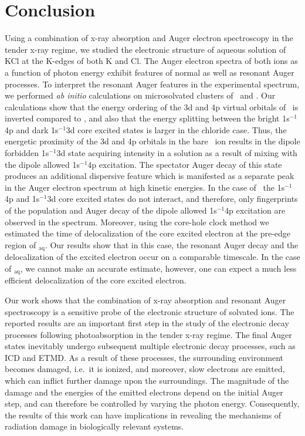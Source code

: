\section{Conclusion}\label{sec:concl}

Using a combination of x-ray absorption and Auger electron spectroscopy in the tender x-ray regime, we studied the electronic structure of aqueous solution of KCl at the K-edges of both K and Cl. The Auger electron spectra of both ions as a function of photon energy exhibit features of normal as well as resonant Auger processes. To interpret the resonant Auger features in the experimental spectrum, we performed {\it ab initio} calculations on microsolvated clusters of \ki~and \cli. Our calculations show that the energy ordering of the 3d and 4p virtual orbitals of \cli~is inverted compared to \ki, and also that the energy splitting between the bright 1s$^{-1}$4p and dark 1s$^{-1}$3d core excited states is larger in the chloride case. Thus, the energetic proximity of the 3d and 4p orbitals in the bare \ki~ion results in the dipole forbidden 1s$^{-1}$3d state acquiring intensity in a solution as a result of mixing with the dipole allowed 1s$^{-1}$4p excitation. The spectator Auger decay of this state produces an additional dispersive feature which is manifested as a separate peak in the Auger electron spectrum at high kinetic energies. In the case of \cli~the 1s$^{-1}$4p and 1s$^{-1}$3d core excited states do not interact, and therefore, only fingerprints of the population and Auger decay of the dipole allowed 1s$^{-1}$4p excitation are observed in the spectrum. Moreover, using the core-hole clock method we estimated the time of delocalization of the core excited electron at the pre-edge region of \cli$_{\text{aq}}$. Our results show that in this case, the resonant Auger decay and the delocalization of the excited electron occur on a comparable timescale. In the case of \ki$_{\text{aq}}$, we cannot make an accurate estimate, however, one can expect a much less efficient delocalization of the core excited electron.


Our work shows that the combination of x-ray absorption and resonant Auger spectroscopy is a sensitive probe of the electronic structure of solvated ions. The reported results are an important first step in the study of the electronic decay processes following photoabsorption in the tender x-ray regime. The final Auger states inevitably undergo subsequent multiple electronic decay processes, such as ICD and ETMD. As a result of these processes, the surrounding environment becomes damaged, i.e.\ it is ionized, and moreover, slow electrons are emitted, which can inflict further damage upon the surroundings. The magnitude of the damage and the energies of the emitted electrons depend on the initial Auger step, and can therefore be controlled by varying the photon energy. Consequently, the results of this work can have implications in revealing the mechanisms of radiation damage in biologically relevant systems.